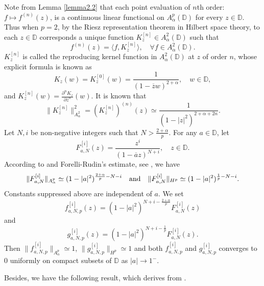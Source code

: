 \documentclass[preprint,12pt,times]{elsarticle}
\theoremstyle{definition}
\theoremstyle{remark}
\numberwithin{equation}{section}
\begin{document}
Note from Lemma \ref{lemma2.2} that each point evaluation of $n$th order: $f\mapsto f^{(n)}(z)$, is a continuous linear functional on $A_{\alpha}^p(\mathbb{D})$ for every $z\in\mathbb{D}$. Thus when $p=2$, by the Riesz representation theorem in Hilbert space theory, to each $z\in\mathbb{D}$ corresponds a unique function $K_z^{[n]}\in A_{\alpha}^2(\mathbb{D})$ such that
\begin{equation}\label{equa2.5}
f^{(n)}(z)=\langle f,K_z^{[n]}\rangle, \quad \forall f\in A_{\alpha}^2(\mathbb{D}).
\end{equation} 
$K_z^{[n]}$ is called the reproducing kernel function in $A_{\alpha}^2(\mathbb{D})$ at $z$ of order $n$, whose explicit formula is known as 
\begin{equation*}
K_z(w)=K_z^{[0]}(w)=\frac{1}{(1-\overline{z}w)^{2+\alpha}},\quad w\in\mathbb{D},
\end{equation*}
and $K_z^{[n]}(w)=\frac{\partial ^nK_z}{\partial\overline{z}^n}(w)$. It is known that
\begin{equation}\label{equa2.6}
\|K_z^{[n]}\|_{A_{\alpha}^2}^2=(K_z^{[n]})^{(n)}(z)\simeq \frac{1}{(1-|z|^2)^{2+\alpha+2n}}.
\end{equation}
Let $N,i$ be non-negative integers such that $N>\frac{2+\alpha}{p}$. For any $a\in\mathbb{D}$, let
\begin{equation*}
F_{a,N}^{[i]}(z)=\frac{z^i}{(1-\overline{a}z)^{N+i}},\quad z\in\mathbb{D}.
\end{equation*} 
According to \cite[Lemma 4.26]{29} and Forelli-Rudin's estimate, see \cite[Theorem 1.12]{28}, we have
\begin{equation*}
\|F_{a,N}^{[i]}\|_{A_{\alpha}^p}\simeq (1-|a|^2)^{\frac{2+\alpha}{p}-N-i}\quad {\rm and}\quad  \|F_{a,N}^{[i]}\|_{H^p}\simeq (1-|a|^2)^{\frac{1}{p}-N-i}.
\end{equation*}
Constants suppressed above are independent of $a$. We set 
\begin{equation*}
f_{a,N,p}^{[i]}(z)=(1-|a|^2)^{N+i-\frac{2+\alpha}{p}}F_{a,N}^{[i]}(z)
\end{equation*}
and
\begin{equation*}
g_{a,N,p}^{[i]}(z)=(1-|a|^2)^{N+i-\frac{1}{p}}F_{a,N}^{[i]}(z).
\end{equation*}
Then $\|f_{a,N,p}^{[i]}\|_{A_{\alpha}^p}\simeq 1$, $\|g_{a,N,p}^{[i]}\|_{H^p}\simeq 1$ and both $f_{a,N,p}^{[i]}$ and $g_{a,N,p}^{[i]}$ converges to 0 uniformly on compact subsets of $\mathbb{D}$ as $|a|\to 1^-$.

Besides, we have the following result, which derives from \cite[Theorem 4.33]{29}.
\end{document}

